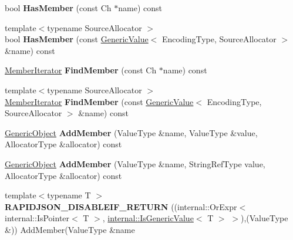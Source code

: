 \begin{DoxyCompactItemize}
\item 
\mbox{\label{classGenericObject_a996d775e52cc7c5cf2aa308cf5a2b2cf}} 
bool {\bfseries Has\+Member} (const Ch $\ast$name) const
\item 
\mbox{\label{classGenericObject_a0b63666ca05c86f9d719350f2302a3f7}} 
{\footnotesize template$<$typename Source\+Allocator $>$ }\\bool {\bfseries Has\+Member} (const \hyperlink{classGenericValue}{Generic\+Value}$<$ Encoding\+Type, Source\+Allocator $>$ \&name) const
\item 
\mbox{\label{classGenericObject_a979890ccb3b116af19f9e3e77d3d286f}} 
\hyperlink{classGenericMemberIterator}{Member\+Iterator} {\bfseries Find\+Member} (const Ch $\ast$name) const
\item 
\mbox{\label{classGenericObject_a12a4fbbf2219d6bb43c3d61923830ab4}} 
{\footnotesize template$<$typename Source\+Allocator $>$ }\\\hyperlink{classGenericMemberIterator}{Member\+Iterator} {\bfseries Find\+Member} (const \hyperlink{classGenericValue}{Generic\+Value}$<$ Encoding\+Type, Source\+Allocator $>$ \&name) const
\item 
\mbox{\label{classGenericObject_a3668524c8566c46cbae97d938064f5fa}} 
\hyperlink{classGenericObject}{Generic\+Object} {\bfseries Add\+Member} (Value\+Type \&name, Value\+Type \&value, Allocator\+Type \&allocator) const
\item 
\mbox{\label{classGenericObject_ae871adc8c906a72878b7cf5df279ed1f}} 
\hyperlink{classGenericObject}{Generic\+Object} {\bfseries Add\+Member} (Value\+Type \&name, String\+Ref\+Type value, Allocator\+Type \&allocator) const
\item 
\mbox{\label{classGenericObject_a98ebcec632c41442d89cd8634b7ecc47}} 
{\footnotesize template$<$typename T $>$ }\\{\bfseries R\+A\+P\+I\+D\+J\+S\+O\+N\+\_\+\+D\+I\+S\+A\+B\+L\+E\+I\+F\+\_\+\+R\+E\+T\+U\+RN} ((internal\+::\+Or\+Expr$<$ internal\+::\+Is\+Pointer$<$ T $>$, \hyperlink{structinternal_1_1IsGenericValue}{internal\+::\+Is\+Generic\+Value}$<$ T $>$ $>$),(Value\+Type \&)) Add\+Member(Value\+Type \&name

\end{DoxyCompactItemize}
